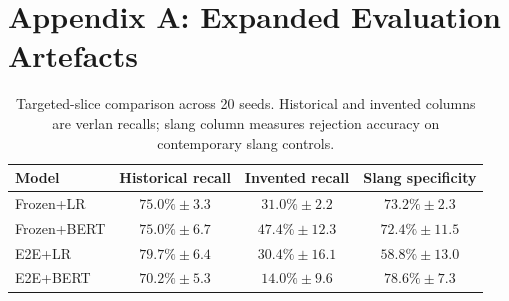 \documentclass[12pt]{article}
\newif\ifskipsectionclear
\begin{document}



\cleardoublepage
\skipsectioncleartrue
{}
\setcounter{page}{1}
\appendix
\setcounter{secnumdepth}{0}

\section{Appendix A: Expanded Evaluation Artefacts}

\begin{table}[H]
    \centering
    \footnotesize
    \caption{Hold-out test aggregates (20 seeds) for trained detectors. Percentages report mean $\pm$ standard deviation across seeds; counts are means.}
    \label{tab:appendix-holdout-aggregates}
\end{table}

\begin{table}[H]
    \centering
    \footnotesize
    \begin{tabular}{lccc}
        \hline
        Model & Historical recall & Invented recall & Slang specificity \\
        \hline
        Frozen+LR & $75.0\%\pm3.3$ & $31.0\%\pm2.2$ & $73.2\%\pm2.3$ \\
        Frozen+BERT & $75.0\%\pm6.7$ & $47.4\%\pm12.3$ & $72.4\%\pm11.5$ \\
        E2E+LR & $79.7\%\pm6.4$ & $30.4\%\pm16.1$ & $58.8\%\pm13.0$ \\
        E2E+BERT & $70.2\%\pm5.3$ & $14.0\%\pm9.6$ & $78.6\%\pm7.3$ \\
        \hline
    \end{tabular}
    \caption{Targeted-slice comparison across 20 seeds. Historical and invented columns are verlan recalls; slang column measures rejection accuracy on contemporary slang controls.}
    \label{tab:appendix-targeted-metrics}
\end{table}
\end{document}

